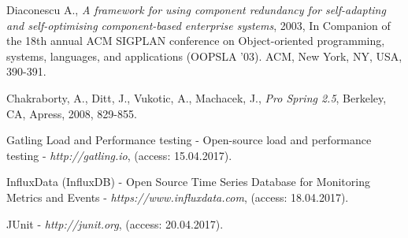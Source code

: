 \documentclass[10pt,a4paper]{article}
\begin{document}
\begin{thebibliography}{9}
Diaconescu A., \textit{A framework for using component redundancy for self-adapting and self-optimising component-based enterprise systems}, 2003, In Companion of the 18th annual ACM SIGPLAN conference on Object-oriented programming, systems, languages, and applications (OOPSLA '03). ACM, New York, NY, USA, 390-391. 

Chakraborty, A., Ditt, J., Vukotic, A., Machacek, J., \textit{Pro Spring 2.5}, Berkeley, CA, Apress, 2008, 829-855.  

Gatling Load and Performance testing - Open-source load and performance testing - \textit{http://gatling.io}, (access: 15.04.2017).

InfluxData (InfluxDB) - Open Source Time Series Database for Monitoring Metrics and Events - \textit{https://www.influxdata.com}, (access: 18.04.2017).


JUnit - \textit{http://junit.org}, (access: 20.04.2017).

\end{thebibliography}
\end{document}
